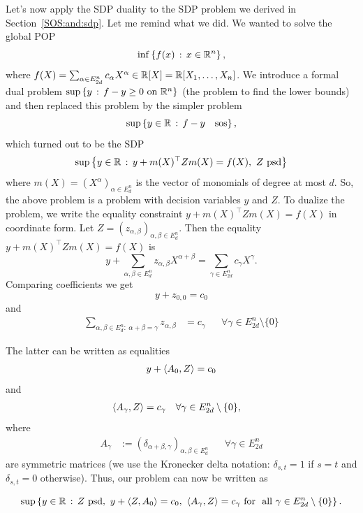 Let's now apply the SDP duality to the SDP problem we derived in Section~\ref{SOS:and:sdp}. Let me remind what we did. We wanted to solve the global POP 
\begin{equation}
	\label{global:pop}
	\inf \left\{ f(x) \,:\,  x \in \mathbb{R}^n  \right\},
\end{equation}
where $f(X)= \sum_{\alpha \in E^n_{2d}} c_\alpha X^\alpha \in \mathbb{R}[X]=\mathbb{R}[X_1,\ldots,X_n]$. We introduce a formal dual problem $\sup \left\{ y \,:\, f - y \ge 0 \ \text{on} \  \mathbb{R}^n \right\}$ (the problem to find the lower bounds) and then replaced this problem by the simpler problem
\[
	\sup \left\{ y \in \mathbb{R} \,:\,  f - y \quad \text{sos} \right\}, 
\]
which turned out to be the SDP
\[
	\sup \left\{ y \in \mathbb{R} \,:\,  y + m(X)^\top Z m(X) = f(X), \ Z \ \text{psd}  \right\}
\]
where $m(X)= (X^\alpha)_{\alpha \in E^n_d}$ is the vector of monomials of degree at most $d$. So, the above problem is a problem with decision variables $y$ and $Z$. To dualize the problem, we write the equality constraint $y + m(X)^\top Z m(X) = f(X)$ in coordinate form. Let $Z=(z_{\alpha,\beta})_{\alpha,\beta \in E^n_d}$. Then the equality $y + m(X)^\top Z m(X)= f(X)$ is 
\[
	y + \sum_{\alpha,\beta \in E^n_d} z_{\alpha,\beta} X^{\alpha+\beta} = \sum_{\gamma \in E^n_{2d}} c_\gamma X^\gamma.
\]
Comparing coefficients we get
\[
	y + z_{0,0} = c_0
\] 
and 
\begin{align*}
	\sum_{\alpha,\beta \in E^n_d : \ \alpha + \beta =\gamma} z_{\alpha,\beta} &=  c_\gamma & & \forall \gamma \in E^n_{2 d} \setminus \{0\}
\end{align*}

The latter can be written as equalities
\begin{align*}
	y + \left\langle A_0 , Z \right\rangle  = c_0
\end{align*}
and
\begin{align*}
	\left\langle A_\gamma , Z \right\rangle &= c_\gamma & &\forall \gamma \in E^n_{2d} \setminus \{0\},
\end{align*}
where
\begin{align*}
	A_\gamma &:= (\delta_{\alpha+\beta,\gamma})_{\alpha,\beta \in E^n_d} & & \forall \gamma \in E^n_{2d}
\end{align*}
are symmetric matrices (we use the Kronecker delta notation: $\delta_{s,t}=1$ if $s=t$ and $\delta_{s,t}=0$ otherwise). Thus, our problem can now be written as 

\begin{equation}
	\label{global:sos:rel:with:equalities}
	\sup \left\{ y \in \mathbb{R} \,:\,  Z \ \text{psd}, \ y+ \left\langle Z , A_0 \right\rangle = c_0, \ \left\langle A_\gamma , Z \right\rangle = c_\gamma \ \text{for \ all} \ \gamma \in E^n_{2d} \setminus \{0\} \right\}.
\end{equation}

